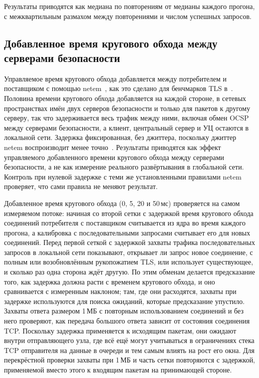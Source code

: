 \documentclass[conference,a4paper]{IEEEtran}
\begin{document}
Результаты приводятся как медиана по повторениям от медианы каждого прогона, с межквартильным
размахом между повторениями и числом успешных запросов.

\subsection{Добавленное время кругового обхода между серверами безопасности}\label{sec:delay}

Управляемое время кругового обхода добавляется между потребителем и поставщиком с помощью
netem~\cite{hemminger2005}, как это сделано для бенчмарков TLS в~\cite{paquin2020}. Половина
времени кругового обхода добавляется на каждой стороне, в сетевых пространствах имён двух серверов безопасности и только
для пакетов к другому серверу, так что задерживается весь трафик между ними, включая обмен OCSP
между серверами безопасности, а клиент, центральный сервер и УЦ остаются в локальной
сети. Задержка фиксированная, без джиттера, поскольку джиттер netem воспроизводит менее
точно~\cite{jurgelionis2011,nussbaum2009}. Результаты приводятся как эффект
управляемого добавленного времени кругового обхода между серверами безопасности, а не как измерение реального
развёртывания в глобальной сети. Контроль при нулевой задержке с теми же установленными правилами netem проверяет, что
сами правила не меняют результат.

Добавленное время кругового обхода (0, 5, 20 и 50\,мс) проверяется на самом измеряемом потоке: начиная со
второй сетки с задержкой время кругового обхода соединений потребителя с поставщиком считывается из
ядра во время каждого прогона, а калибровка с последовательными запросами считывает его для новых соединений.
Перед первой сеткой с задержкой захваты трафика последовательных запросов в локальной сети показывают,
открывает ли запрос новое соединение, с полным или возобновлённым рукопожатием TLS, или использует существующее,
и сколько раз одна сторона ждёт другую. По этим обменам делается предсказание того, как
задержка должна расти с временем кругового обхода, и оно сравнивается с измеренным наклоном; там, где они
расходятся, захваты при задержке используются для поиска ожиданий, которые предсказание упустило. Захваты ответа размером 1\,МБ
с повторным использованием соединений и без него проверяют, как передача большого ответа зависит от
состояния соединения TCP. Поскольку задержка применяется к исходящим пакетам, они ожидают внутри
отправляющего узла, где всё ещё могут учитываться в ограничениях стека TCP отправителя на данные в очереди
и тем самым влиять на рост его окна. Для перекрёстной проверки захваты при 1\,МБ и часть сетки
повторяются с задержкой, применяемой вместо этого к входящим пакетам на принимающей стороне.
\end{document}

